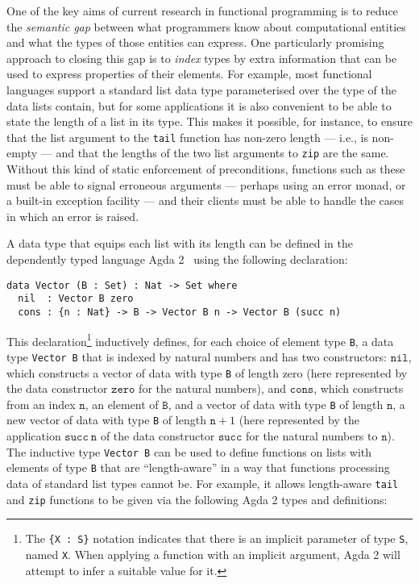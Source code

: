 \documentclass{LMCS}
\newcommand{\tyname}[1]{\texttt{#1}}
\newcommand{\consname}[1]{\texttt{#1}}
\newcommand{\neutral}[1]{\texttt{#1}}
\begin{document}
One of the key aims of current research in functional programming is
to reduce the {\em semantic gap} between what programmers know about
computational entities and what the types of those entities can
express. One particularly promising approach to closing this gap is to
{\em index} types by extra information that can be used to express
properties of their elements. For example, most functional languages
support a standard list data type parameterised over the type of the
data lists contain, but for some applications it is also convenient to
be able to state the length of a list in its type. This makes it
possible, for instance, to ensure that the list argument to the
\verb|tail| function has non-zero length --- i.e., is non-empty ---
and that the lengths of the two list arguments to \verb|zip| are the
same. Without this kind of static enforcement of preconditions,
functions such as these must be able to signal erroneous arguments ---
perhaps using an error monad, or a built-in exception facility --- and
their clients must be able to handle the cases in which an error is
raised.

A data type that equips each list with its length can be defined in
the dependently typed language Agda 2~\cite{agda10} using the
following declaration:
\begin{verbatim}
data Vector (B : Set) : Nat -> Set where
  nil  : Vector B zero
  cons : {n : Nat} -> B -> Vector B n -> Vector B (succ n)
\end{verbatim}

\noindent
This declaration\footnote{The \texttt{\{X : S\}} notation indicates
  that there is an implicit parameter of type \texttt{S}, named
  \texttt{X}. When applying a function with an implicit argument, Agda
  2 will attempt to infer a suitable value for it.} inductively
defines, for each choice of element type \verb|B|, a data type
\verb|Vector B| that is indexed by natural numbers and has two
constructors: $\consname{nil}$, which constructs a vector of data with
type \verb|B| of length zero (here represented by the data constructor
$\consname{zero}$ for the natural numbers), and $\consname{cons}$,
which constructs from an index $\neutral{n}$, an element of
$\tyname{B}$, and a vector of data with type \verb|B| of length
$\neutral{n}$, a new vector of data with type \verb|B| of length
$\neutral{n} + 1$ (here represented by the application
$\consname{succ}\ \neutral{n}$ of the data constructor
$\consname{succ}$ for the natural numbers to $\neutral{n}$). The
inductive type \verb|Vector B| can be used to define functions on
lists with elements of type \verb|B| that are ``length-aware'' in a
way that functions processing data of standard list types cannot
be. For example, it allows length-aware \verb|tail| and \verb|zip|
functions to be given via the following Agda 2 types and definitions:
\end{document}
